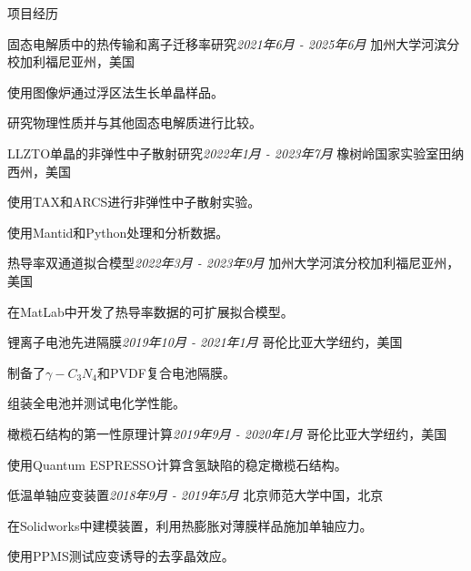 \documentclass{resume} %
\begin{document}
\begin{rSection}{项目经历}
    
\begin{rSubsection}
    {固态电解质中的热传输和离子迁移率研究}{\em 2021年6月 - 2025年6月}
    {加州大学河滨分校}{加利福尼亚州，美国}
\item 使用图像炉通过浮区法生长单晶样品。
\item 研究物理性质并与其他固态电解质进行比较。
\end{rSubsection}

\begin{rSubsection}
    {LLZTO单晶的非弹性中子散射研究}{\em 2022年1月 - 2023年7月}
    {橡树岭国家实验室}{田纳西州，美国}
    \item 使用TAX和ARCS进行非弹性中子散射实验。
    \item 使用Mantid和Python处理和分析数据。
\end{rSubsection}

\begin{rSubsection}
    {热导率双通道拟合模型}{\em 2022年3月 - 2023年9月}
    {加州大学河滨分校}{加利福尼亚州，美国}
\item 在MatLab中开发了热导率数据的可扩展拟合模型。
\end{rSubsection}

\begin{rSubsection}
{锂离子电池先进隔膜}{\em 2019年10月 - 2021年1月}
{哥伦比亚大学}{纽约，美国}
 \item 制备了$\gamma-C_3 N_4$和PVDF复合电池隔膜。
 \item 组装全电池并测试电化学性能。
\end{rSubsection}

\begin{rSubsection}
{橄榄石结构的第一性原理计算}{\em 2019年9月 - 2020年1月}
{哥伦比亚大学}{纽约，美国}
\item 使用Quantum ESPRESSO计算含氢缺陷的稳定橄榄石结构。
\end{rSubsection}

\begin{rSubsection}
{低温单轴应变装置}{\em 2018年9月 - 2019年5月}
{北京师范大学}{中国，北京}
\item 在Solidworks中建模装置，利用热膨胀对薄膜样品施加单轴应力。
\item 使用PPMS测试应变诱导的去孪晶效应。
\end{rSubsection}

\end{rSection}
\end{document}
